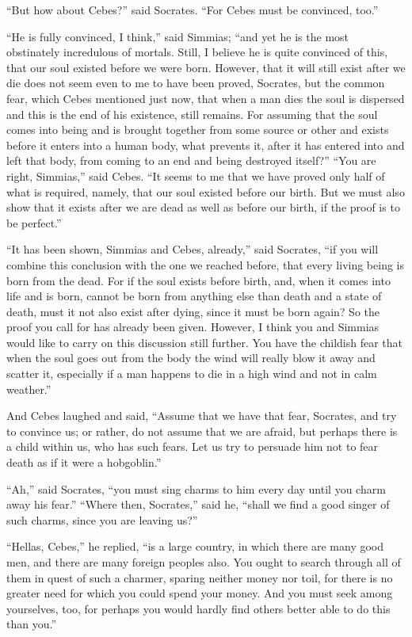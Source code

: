 \documentclass[letterpaper,12pt]{article}
\newcommand{\stephpag}[1]{\marginnote{\small\itshape\fontfamily{ppl}\selectfont #1}}
\begin{document}
\begin{drama}
``But how about Cebes?'' said Socrates. ``For Cebes must be convinced, too.''
 
``He is fully convinced, I think,'' said Simmias; ``and yet he is the most obstinately incredulous of mortals. Still, I believe he is quite convinced of this, that our soul existed \stephpag{b} before we were born. However, that it will still exist after we die does not seem even to me to have been proved, Socrates, but the common fear, which Cebes mentioned just now, that when a man dies the soul is dispersed and this is the end of his existence, still remains. For assuming that the soul comes into being and is brought together from some source or other and exists before it enters into a human body, what prevents it, after it has entered into and left that body, from coming to an end and being destroyed itself?'' \stephpag{c} ``You are right, Simmias,'' said Cebes. ``It seems to me that we have proved only half of what is required, namely, that our soul existed before our birth. But we must also show that it exists after we are dead as well as before our birth, if the proof is to be perfect.''
 
``It has been shown, Simmias and Cebes, already,'' said Socrates, ``if you will combine this conclusion with the one we reached before, that every living being is born from the dead. For if the soul exists before birth, and, \stephpag{d} when it comes into life and is born, cannot be born from anything else than death and a state of death, must it not also exist after dying, since it must be born again? So the proof you call for has already been given. However, I think you and Simmias would like to carry on this discussion still further. You have the childish fear that when the soul goes out from the body the wind will really blow it away and scatter it, especially \stephpag{e} if a man happens to die in a high wind and not in calm weather.''
 
And Cebes laughed and said, ``Assume that we have that fear, Socrates, and try to convince us; or rather, do not assume that we are afraid, but perhaps there is a child within us, who has such fears. Let us try to persuade him not to fear death as if it were a hobgoblin.''
 
``Ah,'' said Socrates, ``you must sing charms to him every day until you charm away his fear.'' \stephpag{78 a} ``Where then, Socrates,'' said he, ``shall we find a good singer of such charms, since you are leaving us?''
 
``Hellas, Cebes,'' he replied, ``is a large country, in which there are many good men, and there are many foreign peoples also. You ought to search through all of them in quest of such a charmer, sparing neither money nor toil, for there is no greater need for which you could spend your money. And you must seek among yourselves, too, for perhaps you would hardly find others better able to do this than you.''
 

\end{drama}
\end{document}
